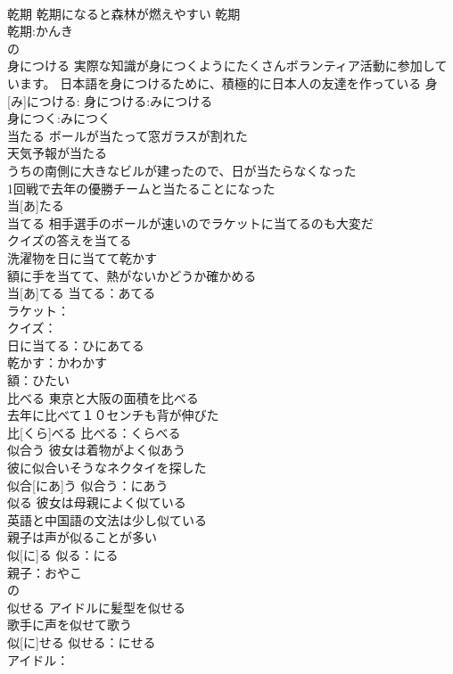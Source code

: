 \documentclass[8pt]{extreport}
\begin{document}
\begin{CJK}{UTF8}{min}
\\	乾期	乾期になると森林が燃えやすい	乾期	
\\	乾期:かんき
\\	の
\\	身につける	実際な知識が身につくようにたくさんボランティア活動に参加しています。 日本語を身につけるために、積極的に日本人の友達を作っている	身[み]につける:			身につける:みにつける
\\	身につく:みにつく
\\	当たる	ボールが当たって窓ガラスが割れた 
\\	天気予報が当たる 
\\	うちの南側に大きなビルが建ったので、日が当たらなくなった 
\\	1回戦で去年の優勝チームと当たることになった 
\\	当[あ]たる						
\\	当てる	相手選手のボールが速いのでラケットに当てるのも大変だ 
\\	クイズの答えを当てる 
\\	洗濯物を日に当てて乾かす 
\\	額に手を当てて、熱がないかどうか確かめる 
\\	当[あ]てる			当てる：あてる
\\	ラケット：
\\	クイズ：
\\	日に当てる：ひにあてる
\\	乾かす：かわかす
\\	額：ひたい
\\	比べる	東京と大阪の面積を比べる 
\\	去年に比べて１０センチも背が伸びた 
\\	比[くら]べる			比べる：くらべる
\\	似合う	彼女は着物がよく似あう 
\\	彼に似合いそうなネクタイを探した 
\\	似合[にあ]う			似合う：にあう
\\	似る	彼女は母親によく似ている 
\\	英語と中国語の文法は少し似ている 
\\	親子は声が似ることが多い 
\\	似[に]る			似る：にる
\\	親子：おやこ
\\	の
\\	似せる	アイドルに髪型を似せる 
\\	歌手に声を似せて歌う 
\\	似[に]せる			似せる：にせる
\\	アイドル：

\end{CJK}
\end{document}
